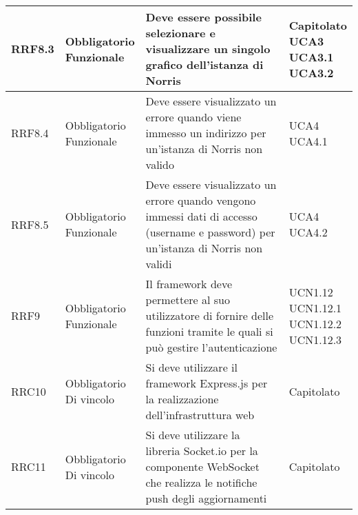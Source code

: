 \begin{longtabu}[c]{|X[0.7,l]|X[l]|X[2.5,l]|X[l]|}
                RRF8.3 & 
                \parbox[t]{4cm}{ Obbligatorio \\ Funzionale} & Deve essere possibile selezionare e visualizzare un singolo grafico dell'istanza di Norris & \parbox[t]{4cm}{Capitolato \\ UCA3 \\ UCA3.1 \\ UCA3.2 }  \\ 
                \hline
                
                RRF8.4 & 
                \parbox[t]{4cm}{ Obbligatorio \\ Funzionale} & Deve essere visualizzato un errore quando viene immesso un indirizzo per un'istanza di Norris non valido & \parbox[t]{4cm}{UCA4 \\ UCA4.1 }  \\ 
                \hline
                
                RRF8.5 & 
                \parbox[t]{4cm}{ Obbligatorio \\ Funzionale} & Deve essere visualizzato un errore quando vengono immessi dati di accesso (username e password) per un'istanza di Norris non validi & \parbox[t]{4cm}{UCA4 \\ UCA4.2 }  \\ 
                \hline
                
                RRF9 & 
                \parbox[t]{4cm}{ Obbligatorio \\ Funzionale} & Il framework deve permettere al suo utilizzatore di fornire delle funzioni tramite le quali si può gestire l'autenticazione & \parbox[t]{4cm}{UCN1.12 \\ UCN1.12.1 \\ UCN1.12.2 \\ UCN1.12.3 }  \\ 
                \hline
                
                RRC10 & 
                \parbox[t]{4cm}{ Obbligatorio \\ Di vincolo} & Si deve utilizzare il framework Express.js per la realizzazione dell'infrastruttura web & \parbox[t]{4cm}{Capitolato }  \\ 
                \hline
                
                RRC11 & 
                \parbox[t]{4cm}{ Obbligatorio \\ Di vincolo} & Si deve utilizzare la libreria Socket.io per la componente WebSocket che realizza le notifiche push degli aggiornamenti & \parbox[t]{4cm}{Capitolato }  \\ 
                \hline
                

\end{longtabu}
